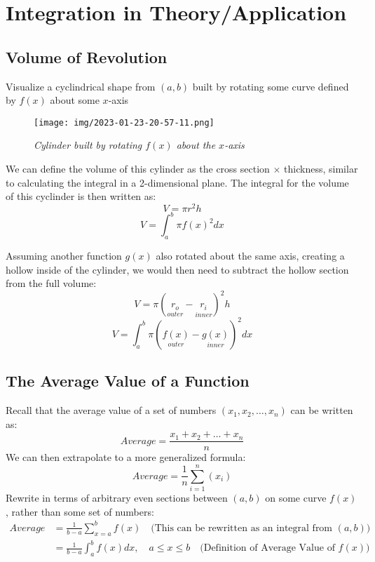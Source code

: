 \documentclass[a4paper]{article}
\begin{document}
  \section{Integration in Theory/Application} 
  \subsection{Volume of Revolution}
  Visualize a cyclindrical shape from $(a,b)$ built by rotating some curve defined by $f(x)$ about some $x$-axis
  \begin{figure}[h]
    \begin{center}
      \texttt{[image: img/2023-01-23-20-57-11.png]}
    \end{center}
    \caption{\textit{Cylinder built by rotating $f(x)$ about the $x$-axis}}
  \end{figure}

  We can define the volume of this cylinder as the cross section $\times$ thickness, similar to calculating the integral in a 2-dimensional plane. The integral for the volume of this cyclinder is then written as:
  \[
    V = \pi r^2 h 
  \]
  \[
    V =\int_{a }^{b} \pi f(x)^2 dx
  \]

  Assuming another function $g(x)$ also rotated about the same axis, creating a hollow inside of the cylinder, we would then need to subtract the hollow section from the full volume:
  \[
    V = \pi (\underset{outer}{r_o} - \underset{inner}{r_i})^2h
  \]
  \[
    V = \int_{a }^{b} \pi (\underset{outer}{f(x)} - \underset{inner}{g(x)})^2 dx
  \]
  \subsection{The Average Value of a Function}
  Recall that the average value of a set of numbers $(x_1,x_2,\dots,x_n)$ can be written as:
  \[
    Average =\frac{x_1 + x_2 + \dots + x_n}{n}
  \]
  We can then extrapolate to a more generalized formula:
  \[
    Average = \frac{1 }{n} \sum_{i=1}^{n} (x_i)
  \]
  Rewrite in terms of arbitrary even sections between $(a,b)$ on some curve $f(x)$, rather than some set of numbers:
  \[
    \begin{split}
      Average &= \frac{1 }{b-a} \sum_{x=a }^{b} f(x) \quad \textrm{(This can be rewritten as an integral from } (a,b))\\ 
              &= \frac{1 }{b-a} \int_{a }^{b} f(x) dx , \quad a \le x \le b \quad \textrm{(Definition of Average Value of $f(x)$)}
    \end{split}
  \]
  
\end{document}
